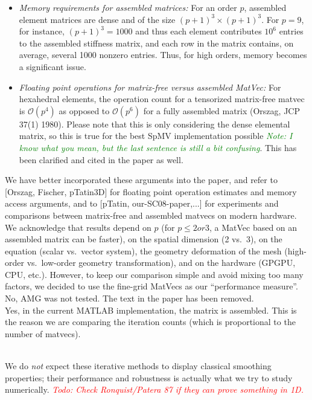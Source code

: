 \documentclass[12pt]{article}
\newcommand{\todo}[1]{\noindent\emph{\textcolor{red}{Todo: #1\:}}}
\newcommand{\note}[1]{\noindent\emph{\textcolor{green}{Note: #1\:}}}
\newcommand{\referee}[1]{\vspace{3ex}\noindent{\textcolor{blue}{#1}}\\[2ex]}
\begin{document}
\begin{itemize}
\item \emph{Memory requirements for assembled matrices:} For an order
  $p$, assembled element matrices are dense and of the size
  $(p+1)^3\times(p+1)^3$. For $p=9$, for instance, $(p+1)^3=1000$ and
  thus each element contributes $10^6$ entries to the assembled
  stiffness matrix, and each row in the matrix contains, on average,
  several 1000 nonzero entries. Thus, for high orders, memory becomes
  a significant issue.
\item \emph{Floating point operations for matrix-free versus assembled
  MatVec:} For hexahedral elements, the operation count for a
  tensorized matrix-free matvec is $\mathcal{O}(p^4)$ as opposed to
  $\mathcal{O}(p^6)$ for a fully assembled matrix (Orszag, JCP 37(1)
  1980). Please note that this is only considering the dense elemental
  matrix, so this is true for the best SpMV implementation possible
  \note{I know what you mean, but the last sentence is still a bit
    confusing}. This has been clarified and cited in the paper as
  well.
\end{itemize}
We have better incorporated these arguments into the paper, and refer
to [Orszag, Fischer, pTatin3D] for floating point operation estimates
and memory access arguments, and to [pTatin, our-SC08-paper,...] for
experiments and comparisons between matrix-free and assembled matvecs
on modern hardware. We acknowledge that results depend on $p$ (for
$p\le 2 or 3$, a MatVec based on an assembled matrix can be faster),
on the spatial dimension (2 vs.\ 3), on the equation (scalar
vs.\ vector system), the geometry deformation of the mesh (high-order
vs.\ low-order geometry transformation), and on the hardware (GPGPU,
CPU, etc.). However, to keep our comparison simple and avoid mixing
too many factors, we decided to use the fine-grid MatVecs as our
``performance measure''.\\[1ex]


\noindent
No, AMG was not tested. The text in the paper has been removed.\\[1ex]

\noindent
Yes, in the current MATLAB implementation, the matrix is
assembled. This is the reason we are comparing the iteration counts
(which is proportional to the number of matvecs).

\referee{ Figure 2 needs some work.  Column 1 displays the smoothing
  properties.  But why should we expect Jacobi, Chebyshev, and SSOR to
  display classic smoothing properties for high-order problems?  And
  why does weighted Jacobi annihilate all high-order modes (for
  linears) in the top corner plot?  In addition, the use of a single
  coarse grid is used here (so it should be labeled two-grid rather
  than V-cycle, but this is minor), but what is the coarse grid?  For
  presentation, a suggestion is to move the rather lengthy paragraph
  in the Figure 2 caption to the section where it is cited.
}
\noindent
We do \emph{not} expect these iterative methods to display classical
smoothing properties; their performance and robustness is actually
what we try to study numerically. \todo{Check Ronquist/Patera 87 if
  they can prove something in 1D.}
\end{document}

